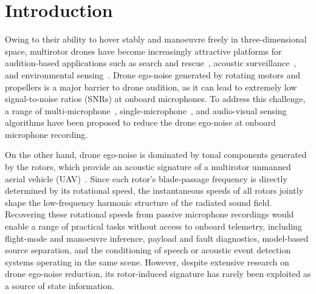 \documentclass{QD_2026}
\begin{document}



\section{Introduction}

Owing to their ability to hover stably and manoeuvre freely in three-dimensional space, multirotor drones have become increasingly attractive platforms for audition-based applications such as search and rescue~, acoustic surveillance~, and environmental sensing~. Drone ego-noise generated by rotating motors and propellers is a major barrier to drone audition, as it can lead to extremely low signal-to-noise ratios (SNRs) at onboard microphones. To address this challenge, a range of multi-microphone~, single-microphone~, and audio-visual sensing~ algorithms have been proposed to reduce the drone ego-noise at onboard microphone recording.

On the other hand, drone ego-noise is dominated by tonal components generated by the rotors, which provide an acoustic signature of a multirotor unmanned aerial vehicle (UAV)~. Since each rotor’s blade-passage frequency is directly determined by its rotational speed, the instantaneous speeds of all rotors jointly shape the low-frequency harmonic structure of the radiated sound field. Recovering these rotational speeds from passive microphone recordings would enable a range of practical tasks without access to onboard telemetry, including flight-mode and manoeuvre inference, payload and fault diagnostics, model-based source separation, and the conditioning of speech or acoustic event detection systems operating in the same scene. However, despite extensive research on drone ego-noise reduction, its rotor-induced signature has rarely been exploited as a source of state information.
\end{document}
